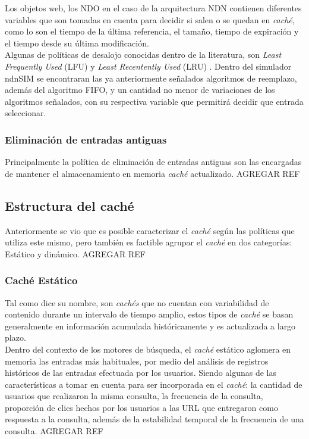 \documentclass[12pt]{ociamthesis}  %
\begin{document}
Los objetos web, los NDO en el caso de la arquitectura NDN contienen diferentes variables que son tomadas en cuenta para decidir si salen o se quedan en \textit{caché}, como lo son el tiempo de la última referencia, el tamaño, tiempo de expiración y el tiempo desde su última modificación.\\

Algunas de políticas de desalojo conocidas dentro de la literatura, son \textit{Least Frequently Used} (LFU) y \textit{Least Recentently Used}
(LRU) \cite{gomez2014servicios}\cite{gan2009improved}\cite{cambazoglu2010refreshing}. Dentro del simulador ndnSIM se encontraran las ya anteriormente señalados algoritmos de reemplazo, además del algoritmo FIFO, y un cantidad no menor de variaciones de los algoritmos señalados, con su respectiva variable que permitirá decidir que entrada seleccionar.\\

\subsubsection{Eliminación de entradas antiguas}
Principalmente la política de eliminación de entradas antiguas son las encargadas de mantener el almacenamiento en memoria \textit{caché} actualizado. AGREGAR REF\\ 

\subsection{Estructura del caché}
Anteriormente se vio que es posible caracterizar el \textit{caché} según las políticas que utiliza este mismo, pero también es factible agrupar el \textit{caché} en dos categorías: Estático y dinámico. AGREGAR REF\\

\subsubsection{Caché Estático}
Tal como dice su nombre, son \textit{cachés} que no cuentan con variabilidad de contenido durante un intervalo de tiempo amplio, estos tipos de \textit{caché} se basan generalmente en información acumulada históricamente y es actualizada a largo plazo.\\

Dentro del contexto de los motores de búsqueda, el \textit{caché} estático aglomera en memoria las entradas más habituales, por medio del análisis de registros históricos de las entradas efectuada por los usuarios. Siendo algunas de las características a tomar en cuenta para ser incorporada en el \textit{caché}: la cantidad de usuarios que realizaron la misma consulta, la frecuencia de la consulta, proporción de clics hechos por los usuarios a las URL que entregaron como respuesta a la consulta, además de la estabilidad temporal de la frecuencia de una consulta. AGREGAR REF\\
\end{document}
